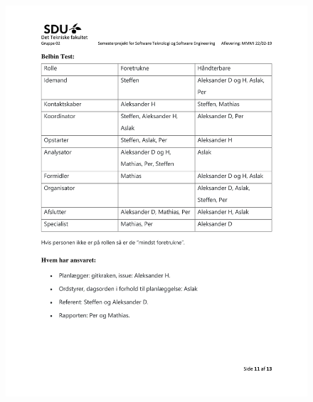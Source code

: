 \begin{figure}[hb]
  \includegraphics[scale = 0.33]{./PNG/Projektforslag/Projektforslag-11.jpg} 
\end{figure}


